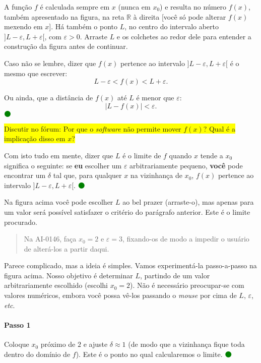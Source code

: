 \documentclass[fleqn,12pt]{article}
\newenvironment{ct}{\begin{quotation}\color{red!30!black}\sffamily\small}{\end{quotation}} %
\newcommand\foreign[1]{\textsl{#1}}
\newcommand\etc{\foreign{etc}}
\newcommand\proceed{\textcolor{green}{$\medbullet$}\xspace}
\newcommand\forum[1]{\colorbox{yellow}{Discutir no fórum: #1}}
\begin{document}
    A função $f$ é calculada sempre em $x$ (nunca em $x_0$) e resulta no número $f(x)$, também apresentado na figura, na reta $\mathbb{R}$ à direita [você só pode alterar $f(x)$ mexendo em $x$]. Há também o ponto $L$, no centro do intervalo aberto $]L - \varepsilon, L + \varepsilon[$, com $\varepsilon > 0$. Arraste $L$ e os colchetes ao redor dele para entender a construção da figura antes de continuar. 

    Caso não se lembre, dizer que $f(x)$ pertence ao intervalo $]L - \varepsilon, L + \varepsilon[$ é o mesmo que escrever:
    \begin{equation*}
	L - \varepsilon < f(x) < L + \varepsilon.
    \end{equation*}

    Ou ainda, que a distância de $f(x)$ até $L$ é menor que $\varepsilon$:
    \begin{equation*}
	|L - f(x)| < \varepsilon.
    \end{equation*} \proceed

    \forum{Por que o \foreign{software} não permite mover $f(x)$? Qual é a implicação disso em $x$?}

    Com isto tudo em mente, dizer que $L$ é o limite de $f$ quando $x$ tende a $x_0$ significa o seguinte: se \textbf{eu} escolher um $\varepsilon$ arbitrariamente pequeno, \textbf{você} pode encontrar um $\delta$ tal que, para qualquer $x$ na vizinhança de $x_0$, $f(x)$ pertence ao intervalo $]L - \varepsilon, L + \varepsilon[$. \proceed

    Na figura acima você pode escolher $L$ ao bel prazer (arraste-o), mas apenas para um valor será possível satisfazer o critério do parágrafo anterior. Este é o limite procurado.

    \begin{ct}
	Na AI-0146, faça $x_0 = 2$ e $\varepsilon = 3$, fixando-os de modo a impedir o usuário de alterá-los a partir daqui.	
    \end{ct}

    Parece complicado, mas a ideia é simples. Vamos experimentá-la passo-a-passo na figura acima. Nosso objetivo é determinar $L$, partindo de um valor arbitrariamente escolhido (escolhi $x_0 = 2$). Não é necessário preocupar-se com valores numéricos, embora você possa vê-los passando o \foreign{mouse} por cima de $L$, $\varepsilon$, \etc.

    \paragraph{Passo 1} Coloque $x_0$ próximo de $2$ e ajuste $\delta \approx 1$ (de modo que a vizinhança fique toda dentro do domínio de $f$). Este é o ponto no qual calcularemos o limite. \proceed
\end{document}
